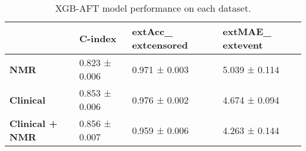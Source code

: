 \begin{table}
\caption{XGB-AFT model performance on each dataset.}
\label{tab:results_ex2}
\begin{tabular}{llll}
\toprule
 & C-index & 	ext{Acc}_{	ext{censored}} & 	ext{MAE}_{	ext{event}} \\
\midrule
\textbf{NMR} & 0.823 ± 0.006 & 0.971 ±                 0.003 & 5.039 ± 0.114 \\
\textbf{Clinical} & 0.853 ± 0.006 & 0.976 ±                 0.002 & 4.674 ± 0.094 \\
\textbf{Clinical + NMR} & 0.856 ± 0.007 & 0.959 ±                 0.006 & 4.263 ± 0.144 \\
\bottomrule
\end{tabular}
\end{table}
